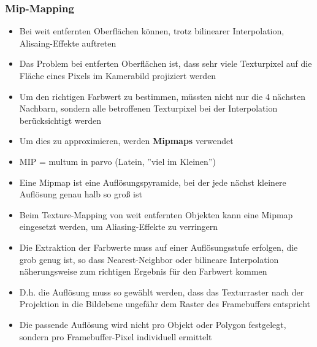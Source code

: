\documentclass{scrartcl}
\begin{document}
\subsubsection{Mip-Mapping}

\begin{itemize}
	\item Bei weit entfernten Oberflächen können, trotz bilinearer Interpolation, Alisaing-Effekte auftreten
	\item Das Problem bei entferten Oberflächen ist, dass sehr viele Texturpixel auf die Fläche eines Pixels im Kamerabild projiziert werden
	\item Um den richtigen Farbwert zu bestimmen, müssten nicht nur die 4 nächsten Nachbarn, sondern alle betroffenen Texturpixel bei der Interpolation berücksichtigt werden
	\item Um dies zu approximieren, werden \textbf{Mipmaps} verwendet
	\item MIP = multum in parvo (Latein, ''viel im Kleinen'')
	\item Eine Mipmap ist eine Auflösungspyramide, bei der jede nächst kleinere Auflösung genau halb so groß ist
	\item Beim Texture-Mapping von weit entfernten Objekten kann eine Mipmap eingesetzt werden, um Aliasing-Effekte zu verringern
	\item Die Extraktion der Farbwerte muss auf einer Auflösungsstufe erfolgen, die grob genug ist, so dass Nearest-Neighbor oder bilineare Interpolation näherungsweise zum richtigen Ergebnis für den Farbwert kommen
	\item D.h. die Auflösung muss so gewählt werden, dass das Texturraster nach der Projektion in die Bildebene ungefähr dem Raster des Framebuffers entspricht
	\item Die passende Auflösung wird nicht pro Objekt oder Polygon festgelegt, sondern pro Framebuffer-Pixel individuell ermittelt
\end{itemize}
\end{document}
